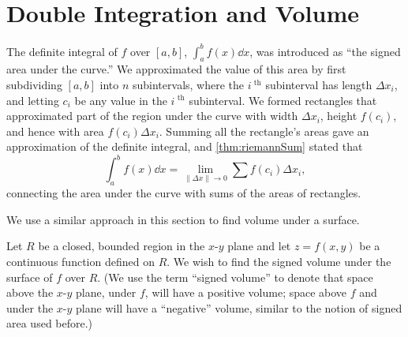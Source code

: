 \section{Double Integration and Volume}\label{sec:double_int_volume}

The definite integral of $f$ over $[a,b]$, $\int_a^b f(x)\dd x$, was introduced as ``the signed area under the curve.'' We approximated the value of this area by first subdividing $[a,b]$ into $n$ subintervals, where the $i^\text{ th}$ subinterval has length $\Delta x_i$, and letting $c_i$ be any value in the $i^\text{ th}$ subinterval. We formed rectangles that approximated part of the region under the curve with width $\Delta x_i$, height $f(c_i)$, and hence with area $f(c_i)\Delta x_i$. Summing all the rectangle's areas gave an approximation of the definite integral, and \autoref{thm:riemannSum} stated that
\[\int_a^bf(x)\dd x = \lim_{\|\Delta x\|\to 0}\sum f(c_i)\Delta x_i,\]
connecting the area under the curve with sums of the areas of rectangles.\bigskip

We use a similar approach in this section to find volume under a surface.\bigskip

Let $R$ be a closed, bounded region in the $x$-$y$ plane and let $z=f(x,y)$ be a continuous function defined on $R$. We wish to find the signed volume under the surface of $f$ over $R$. (We use the term ``signed volume'' to denote that space above the $x$-$y$ plane, under $f$, will have a positive volume; space above $f$ and under the $x$-$y$ plane will have a ``negative'' volume, similar to the notion of signed area used before.)

